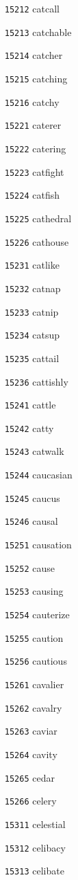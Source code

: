 \documentclass[twoside,11pt]{article}
\begin{document}
\begin{multicols}{5}
\begin{enumerate}
\item[\texttt{15212}] catcall
\item[\texttt{15213}] catchable
\item[\texttt{15214}] catcher
\item[\texttt{15215}] catching
\item[\texttt{15216}] catchy
\item[\texttt{15221}] caterer
\item[\texttt{15222}] catering
\item[\texttt{15223}] catfight
\item[\texttt{15224}] catfish
\item[\texttt{15225}] cathedral
\item[\texttt{15226}] cathouse
\item[\texttt{15231}] catlike
\item[\texttt{15232}] catnap
\item[\texttt{15233}] catnip
\item[\texttt{15234}] catsup
\item[\texttt{15235}] cattail
\item[\texttt{15236}] cattishly
\item[\texttt{15241}] cattle
\item[\texttt{15242}] catty
\item[\texttt{15243}] catwalk
\item[\texttt{15244}] caucasian
\item[\texttt{15245}] caucus
\item[\texttt{15246}] causal
\item[\texttt{15251}] causation
\item[\texttt{15252}] cause
\item[\texttt{15253}] causing
\item[\texttt{15254}] cauterize
\item[\texttt{15255}] caution
\item[\texttt{15256}] cautious
\item[\texttt{15261}] cavalier
\item[\texttt{15262}] cavalry
\item[\texttt{15263}] caviar
\item[\texttt{15264}] cavity
\item[\texttt{15265}] cedar
\item[\texttt{15266}] celery
\item[\texttt{15311}] celestial
\item[\texttt{15312}] celibacy
\item[\texttt{15313}] celibate

\end{enumerate}
\end{multicols}
\end{document}
